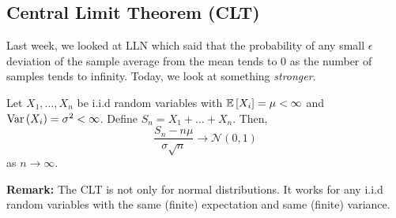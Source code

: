 \subsection{Central Limit Theorem (CLT)}
Last week, we looked at LLN which said that the probability of any small $\epsilon$ deviation of the sample average from the mean tends to 0 as the number of samples tends to infinity. Today, we look at something \textit{stronger}. 

\begin{theorem}
    Let $X_1, \ldots, X_n$ be i.i.d random variables with $\mathbb{E}\left[ X_i \right] = \mu < \infty$ and $\text{Var}\left( X_i \right) = \sigma^2 < \infty$. Define $S_n = X_1 + \ldots + X_n$. Then, \[ \frac{S_n - n \mu}{\sigma \sqrt{n}} \to \mathcal{N}(0, 1) \] as $n \to \infty$. 
\end{theorem}

\textbf{Remark:} The CLT is not only for normal distributions. It works for any i.i.d random variables with the same (finite) expectation and same (finite) variance. 
